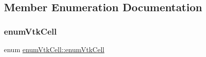\subsection{Member Enumeration Documentation}
\mbox{\label{classenum_vtk_cell_a23bd5b15dca3ba8d55771957ae5b2508}} 
\subsubsection{\texorpdfstring{enum\+Vtk\+Cell}{enumVtkCell}}
{\footnotesize\ttfamily enum \hyperlink{classenum_vtk_cell_a23bd5b15dca3ba8d55771957ae5b2508}{enum\+Vtk\+Cell\+::enum\+Vtk\+Cell}}

